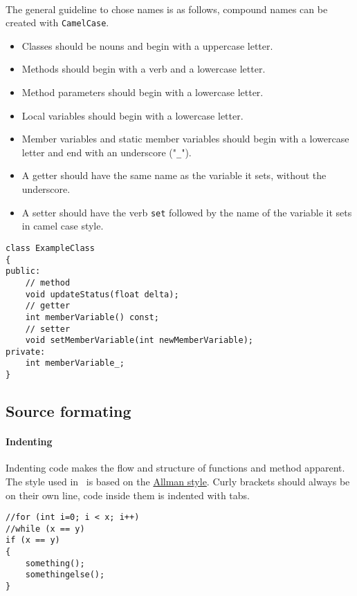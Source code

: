 \paragraph{}
The general guideline to chose names is as follows, compound names can be created with \texttt{CamelCase}.

\begin{itemize}
\item Classes should be nouns and begin with a uppercase letter.
\item Methods should begin with a verb and a lowercase letter.
\item Method parameters should begin with a lowercase letter.
\item Local variables should begin with a lowercase letter.
\item Member variables and static member variables should begin with a lowercase letter and end with an underscore ("\texttt{\_}").
\item A getter should have the same name as the variable it sets, without the underscore.
\item A setter should have the verb \texttt{set} followed by the name of the variable it sets in camel case style.
\end{itemize}

\begin{lstlisting}[caption={Naming example}]
class ExampleClass
{
public:
	// method
	void updateStatus(float delta);
	// getter
	int memberVariable() const;
	// setter
	void setMemberVariable(int newMemberVariable);
private:
	int memberVariable_;
}
\end{lstlisting}


\subsection{Source formating}

\paragraph{Indenting}
Indenting code makes the flow and structure of functions and method apparent.
The style used in \ER\ is based on the \href{http://en.wikipedia.org/wiki/Indent_style}{Allman style}.
Curly brackets should always be on their own line, code inside them is indented with tabs.

\begin{lstlisting}[caption={Indenting example}]
//for (int i=0; i < x; i++)
//while (x == y)
if (x == y)
{
    something();
    somethingelse();
}
\end{lstlisting}

